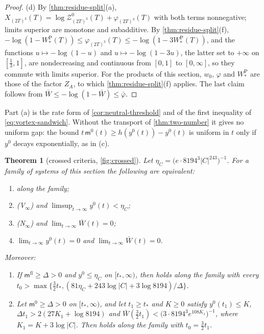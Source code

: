 \documentclass[11pt,a4paper]{amsart}
\newtheorem{theorem}{Theorem}[section]
\theoremstyle{definition}
\theoremstyle{remark}
\numberwithin{equation}{section}
\newcommand{\abs}[1]{\lvert #1\rvert}      %
\newcommand{\TT}{\mathbb{T}}               %
\newcommand{\Zc}{\mathcal{Z}}              %
\newcommand{\XT}[2]{X_{#1}(#2)}            %
\newcommand{\cube}[1]{(2#1)^3}             %
\newcommand{\Mcirc}{\text{\upshape(M$^{\circ}$)}}   %
\newcommand{\tzero}{t_0}                   %
\begin{document}
\begin{proof}
(d) By \cref{thm:residue-split}\textup{(a)}, $\XT{\cube T}{T}=\log\Zc^0_{\cube T}(T)+\varphi_{\cube T}(T)$ with both terms nonnegative; limits superior are monotone and subadditive. By \cref{thm:residue-split}\textup{(f)}, $-\log(1-W^{\mathrm P}_*(T))\le\varphi_{\cube T}(T)\le-\log(1-3W^{\mathrm P}_*(T))$, and the functions $u\mapsto-\log(1-u)$ and $u\mapsto-\log(1-3u)$, the latter set to $+\infty$ on $[\frac13,1]$, are nondecreasing and continuous from $[0,1]$ to $[0,\infty]$, so they commute with limits superior. For the products of this section, $w_0$, $\varphi$ and $W^{\mathrm P}_*$ are those of the factor $Z_A$, to which \cref{thm:residue-split}\textup{(f)} applies. The last claim follows from $\bar W\le-\log(1-\bar W)\le\bar\varphi$.
\end{proof}

Part (a) is the rate form of \cref{cor:neutral-threshold} and of the first inequality of \eqref{eq:vortex-sandwich}. Without the transport of \cref{thm:two-number} it gives no uniform gap: the bound $t\,\mathsf m^0(t)\ge h(y^0(t))-y^0(t)$ is uniform in $t$ only if $y^0$ decays exponentially, as in (c).

\begin{theorem}[crossed criteria, \cref{fig:crossed}]\label{thm:crossed-criteria}
Let $\eta_C=\bigl(e\cdot8194^3\abs{C}^{243}\bigr)^{-1}$. For a family of systems of this section the following are equivalent:
\begin{enumerate}[label=\textup{(\alph*)},leftmargin=*]
\item \Mcirc{} along the family;
\item \textup{(V$_\infty$)} and $\limsup_{t\to\infty}y^0(t)<\eta_C$;
\item \textup{(N$_\infty$)} and $\lim_{t\to\infty}\bar W(t)=0$;
\item $\lim_{t\to\infty}y^0(t)=0$ and $\lim_{t\to\infty}\bar W(t)=0$.
\end{enumerate}
Moreover:
\begin{enumerate}[label=\textup{(\roman*)},leftmargin=*]
\item If $\mathsf m^{\mathrm{fl}}\ge\Delta>0$ and $y^0\le\eta_C$ on $[t_*,\infty)$, then \Mcirc{} holds along the family with every $\tzero>\max\{\frac32t_*,(81\eta_C+243\log\abs{C}+3\log8194)/\Delta\}$.
\item Let $\mathsf m^0\ge\Delta>0$ on $[t_*,\infty)$, and let $t_1\ge t_*$ and $K\ge0$ satisfy $y^0(t_1)\le K$, $\Delta t_1>2(27K_1+\log8194)$ and $\bar W(\frac32t_1)<\bigl(3\cdot8194^3e^{108K_1}\bigr)^{-1}$, where $K_1=K+3\log\abs{C}$. Then \Mcirc{} holds along the family with $\tzero=\frac32t_1$.
\end{enumerate}
\end{theorem}
\end{document}
